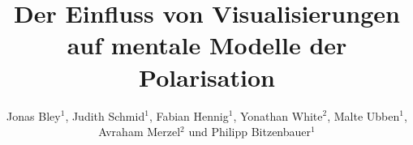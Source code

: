 \title[Mentale Modelle und Polarisation]{Der Einfluss von Visualisierungen auf mentale Modelle der Polarisation}
\author{Jonas Bley$^1$, Judith Schmid$^1$, Fabian Hennig$^1$, Yonathan White$^2$, Malte Ubben$^1$, Avraham Merzel$^2$ und Philipp Bitzenbauer$^1$}
\date{}
